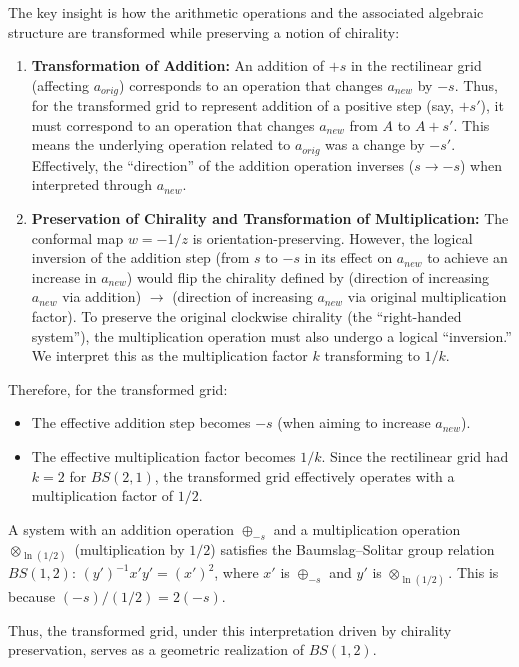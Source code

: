 The key insight is how the arithmetic operations and the associated algebraic structure are transformed while preserving a notion of chirality:
\begin{enumerate}
    \item \textbf{Transformation of Addition:} An addition of $+s$ in the rectilinear grid (affecting $a_{orig}$) corresponds to an operation that changes $a_{new}$ by $-s$. Thus, for the transformed grid to represent addition of a positive step (say, $+s'$), it must correspond to an operation that changes $a_{new}$ from $A$ to $A+s'$. This means the underlying operation related to $a_{orig}$ was a change by $-s'$. Effectively, the ``direction'' of the addition operation inverses ($s \to -s$) when interpreted through $a_{new}$.

    \item \textbf{Preservation of Chirality and Transformation of Multiplication:} The conformal map $w=-1/z$ is orientation-preserving. However, the logical inversion of the addition step (from $s$ to $-s$ in its effect on $a_{new}$ to achieve an increase in $a_{new}$) would flip the chirality defined by (direction of increasing $a_{new}$ via addition) $\to$ (direction of increasing $a_{new}$ via original multiplication factor). To preserve the original clockwise chirality (the ``right-handed system''), the multiplication operation must also undergo a logical ``inversion.'' We interpret this as the multiplication factor $k$ transforming to $1/k$.
\end{enumerate}
Therefore, for the transformed grid:
\begin{itemize}
    \item The effective addition step becomes $-s$ (when aiming to increase $a_{new}$).
    \item The effective multiplication factor becomes $1/k$. Since the rectilinear grid had $k=2$ for $BS(2,1)$, the transformed grid effectively operates with a multiplication factor of $1/2$.
\end{itemize}
A system with an addition operation $\oplus_{-s}$ and a multiplication operation $\otimes_{\ln(1/2)}$ (multiplication by $1/2$) satisfies the Baumslag--Solitar group relation $BS(1,2)$: $(y')^{-1}x'y' = (x')^2$, where $x'$ is $\oplus_{-s}$ and $y'$ is $\otimes_{\ln(1/2)}$. This is because $(-s)/(1/2) = 2(-s)$.

Thus, the transformed grid, under this interpretation driven by chirality preservation, serves as a geometric realization of \textbf{$BS(1,2)$}.

